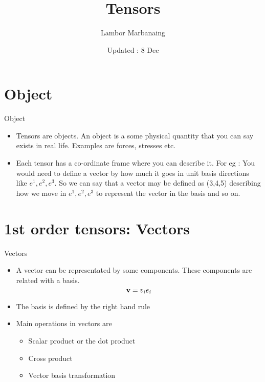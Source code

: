 
\title{Tensors }
\author{Lambor Marbanaing}
\date{Updated : 8 Dec}
\maketitle
\tableofcontents

\section{Object}
	\begin{frame}{Object}
		\begin{itemize}
			
			\item Tensors are objects. An object is a some physical quantity that you can say exists in real life. Examples are forces, stresses etc.
			
			\item Each tensor has a co-ordinate frame where you can describe it. For eg : You would need to define a vector by how much it goes in unit basis directions like $e^1, e^2, e^3$. So we can say that a vector may be defined as (3,4,5) describing how we move in $e^1, e^2, e^3$ to represent the vector in the basis and so on. 
		\end{itemize}
	\end{frame}
	
\section{1st order tensors: Vectors}
	\begin{frame}{Vectors}
		\begin{itemize}
			\item A vector can be representated by some components. These components are related with a basis.
			\begin{equation}
			   \mathbf{v} = v_i e_i 
			\end{equation}
			\item The basis is defined by the right hand rule
			\item  Main operations in vectors are 
				\begin{itemize}
					\item Scalar product or the dot product
					\item Cross product
					\item Vector basis transformation
					
				\end{itemize}
		\end{itemize}
	\end{frame}


